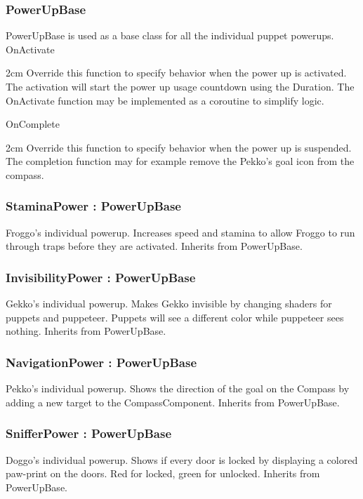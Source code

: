 \documentclass[11pt]{article}
\newenvironment{indentall}{\begin{adjustwidth}{2cm}{}}{\end{adjustwidth}}
\begin{document}
\subsubsection{PowerUpBase}
PowerUpBase is used as a base class for all the individual puppet powerups.
\newline 
\newline OnActivate
\begin{indentall}
Override this function to specify behavior when the power up is activated. The activation will start the power up usage countdown using the Duration. The OnActivate function may be implemented as a coroutine to simplify logic.
\end{indentall}
OnComplete
\begin{indentall}
Override this function to specify behavior when the power up is suspended. The completion function may for example remove the Pekko’s goal icon from the compass.
\end{indentall}

\subsubsection{StaminaPower : PowerUpBase}
Froggo's individual powerup. Increases speed and stamina to allow Froggo to run through traps before they are activated. Inherits from PowerUpBase.

\subsubsection{InvisibilityPower : PowerUpBase}
Gekko's individual powerup. Makes Gekko invisible by changing shaders for puppets and puppeteer. Puppets will see a different color while puppeteer sees nothing. Inherits from PowerUpBase.

\subsubsection{NavigationPower : PowerUpBase}
Pekko's individual powerup. Shows the direction of the goal on the Compass by adding a new target to the CompassComponent. Inherits from PowerUpBase.

\subsubsection{SnifferPower : PowerUpBase}
Doggo's individual powerup. Shows if every door is locked by displaying a colored paw-print on the doors. Red for locked, green for unlocked. Inherits from PowerUpBase.
\end{document}
